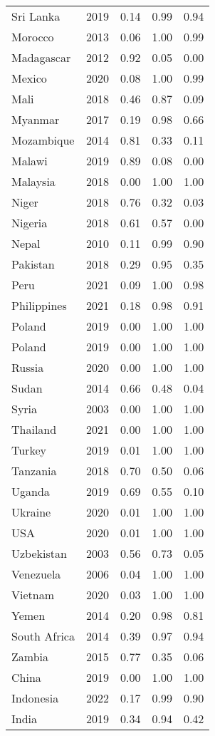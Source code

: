 \begin{longtable}[t]{lrrrr}
Sri Lanka & 2019 & 0.14 & 0.99 & 0.94\\
Morocco & 2013 & 0.06 & 1.00 & 0.99\\
Madagascar & 2012 & 0.92 & 0.05 & 0.00\\
Mexico & 2020 & 0.08 & 1.00 & 0.99\\
Mali & 2018 & 0.46 & 0.87 & 0.09\\
Myanmar & 2017 & 0.19 & 0.98 & 0.66\\
Mozambique & 2014 & 0.81 & 0.33 & 0.11\\
Malawi & 2019 & 0.89 & 0.08 & 0.00\\
Malaysia & 2018 & 0.00 & 1.00 & 1.00\\
Niger & 2018 & 0.76 & 0.32 & 0.03\\
Nigeria & 2018 & 0.61 & 0.57 & 0.00\\
Nepal & 2010 & 0.11 & 0.99 & 0.90\\
Pakistan & 2018 & 0.29 & 0.95 & 0.35\\
Peru & 2021 & 0.09 & 1.00 & 0.98\\
Philippines & 2021 & 0.18 & 0.98 & 0.91\\
Poland & 2019 & 0.00 & 1.00 & 1.00\\
Poland & 2019 & 0.00 & 1.00 & 1.00\\
Russia & 2020 & 0.00 & 1.00 & 1.00\\
Sudan & 2014 & 0.66 & 0.48 & 0.04\\
Syria & 2003 & 0.00 & 1.00 & 1.00\\
Thailand & 2021 & 0.00 & 1.00 & 1.00\\
Turkey & 2019 & 0.01 & 1.00 & 1.00\\
Tanzania & 2018 & 0.70 & 0.50 & 0.06\\
Uganda & 2019 & 0.69 & 0.55 & 0.10\\
Ukraine & 2020 & 0.01 & 1.00 & 1.00\\
USA & 2020 & 0.01 & 1.00 & 1.00\\
Uzbekistan & 2003 & 0.56 & 0.73 & 0.05\\
Venezuela & 2006 & 0.04 & 1.00 & 1.00\\
Vietnam & 2020 & 0.03 & 1.00 & 1.00\\
Yemen & 2014 & 0.20 & 0.98 & 0.81\\
South Africa & 2014 & 0.39 & 0.97 & 0.94\\
Zambia & 2015 & 0.77 & 0.35 & 0.06\\
China & 2019 & 0.00 & 1.00 & 1.00\\
Indonesia & 2022 & 0.17 & 0.99 & 0.90\\
India & 2019 & 0.34 & 0.94 & 0.42\\
\bottomrule
\end{longtable}